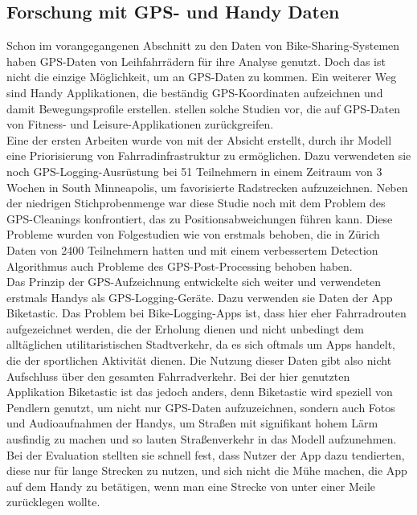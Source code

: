 \documentclass[a4paper,12pt]{thesis}
\begin{document}
\subsection{Forschung mit GPS- und Handy Daten}\label{chpt:gps}


Schon im vorangegangenen Abschnitt zu den Daten von Bike-Sharing-Systemen haben \cite{Li2022} GPS-Daten von Leihfahrrädern für ihre Analyse genutzt. Doch das ist nicht die einzige Möglichkeit, um an GPS-Daten zu kommen. Ein weiterer Weg sind Handy Applikationen, die beständig GPS-Koordinaten aufzeichnen und damit Bewegungsprofile erstellen. \cite{Romanillos2016} stellen solche Studien vor, die auf GPS-Daten von Fitness- und Leisure-Applikationen zurückgreifen.\\ 
Eine der ersten Arbeiten wurde von \cite{Harvey2007} mit der Absicht erstellt, durch ihr Modell eine Priorisierung von Fahrradinfrastruktur zu ermöglichen. Dazu verwendeten sie noch GPS-Logging-Ausrüstung bei 51 Teilnehmern in einem Zeitraum von 3 Wochen in South Minneapolis, um favorisierte Radstrecken aufzuzeichnen. Neben der niedrigen Stichprobenmenge war diese Studie noch mit dem Problem des GPS-Cleanings konfrontiert, das zu Positionsabweichungen führen kann. Diese Probleme wurden von Folgestudien wie von \cite{Menghini2010} erstmals behoben, die in Zürich Daten von 2400 Teilnehmern hatten und mit einem verbessertem Detection Algorithmus auch Probleme des GPS-Post-Processing behoben haben.\\ 
Das Prinzip der GPS-Aufzeichnung entwickelte sich weiter und \cite{Reddy2010} verwendeten erstmals Handys als GPS-Logging-Geräte. Dazu verwenden sie Daten der App Biketastic. Das Problem bei Bike-Logging-Apps ist, dass hier eher Fahrradrouten aufgezeichnet werden, die der Erholung dienen und nicht unbedingt dem alltäglichen utilitaristischen Stadtverkehr, da es sich oftmals um Apps handelt, die der sportlichen Aktivität dienen. Die Nutzung dieser Daten gibt also nicht Aufschluss über den gesamten Fahrradverkehr. Bei der hier genutzten Applikation Biketastic ist das jedoch anders, denn Biketastic wird speziell von Pendlern genutzt, um nicht nur GPS-Daten aufzuzeichnen, sondern auch Fotos und Audioaufnahmen der Handys, um Straßen mit signifikant hohem Lärm ausfindig zu machen und so lauten Straßenverkehr in das Modell aufzunehmen. Bei der Evaluation stellten sie schnell fest, dass Nutzer der App dazu tendierten, diese nur für lange Strecken zu nutzen, und sich nicht die Mühe machen, die App auf dem Handy zu betätigen, wenn man eine Strecke von unter einer Meile zurücklegen wollte.\\
\end{document}
